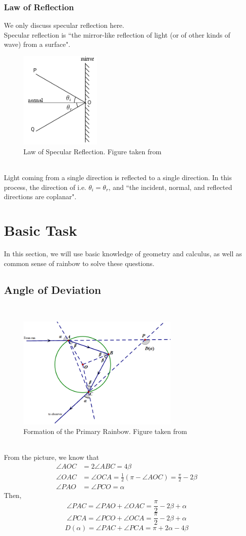 \documentclass{article}
\begin{document}
\begin{spacing}{1.5}
\subsubsection{Law of Reflection}
We only discuss specular reflection here.\\
\newpage
Specular reflection is ``the mirror-like reflection of light (or of other kinds of wave) from a surface".
\begin{figure}[!htb]
\centering
\includegraphics[width=4cm]{reflection.png}
\caption{Law of Specular Reflection. Figure taken from \cite{Reflection}}
\end{figure}
\\
Light coming from a single direction is reflected to a single direction. In this process, the direction of i.e. $\theta _i =\theta _r$, and ``the incident, normal, and reflected directions are coplanar". \cite{Reflection}
\newpage
\section{Basic Task}
In this section, we will use basic knowledge of geometry and calculus, as well as common sense of rainbow to solve these questions.
\subsection{Angle of Deviation}
\  \\
\begin{figure}[!htb]
\centering
\includegraphics[width=8cm]{2_1.png}
\caption{Formation of the Primary Rainbow. Figure taken from \cite{Calculus}}
\end{figure}
\\
From the picture, we know that
\begin{align*}
\angle AOC& = 2\angle ABC = 4\beta\\
\angle OAC& =\angle OCA = \frac{1}{2}(\pi - \angle AOC)=\frac{\pi}{2}-2\beta\\
\angle PAO& = \angle PCO = \alpha
\end{align*}
Then, $$\angle PAC=\angle PAO + \angle OAC=\frac{\pi}{2}-2\beta+\alpha$$
$$\angle PCA=\angle PCO +\angle OCA = \frac{\pi}{2}-2\beta +\alpha$$
$$D(\alpha)=\angle PAC + \angle PCA =\pi + 2\alpha -4\beta$$

\end{spacing}
\end{document}
